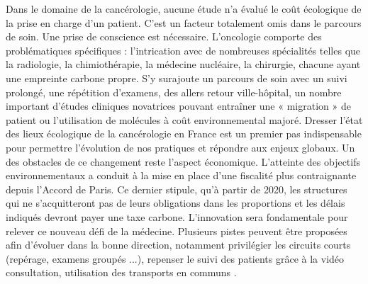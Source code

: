 Dans le domaine de la cancérologie, aucune étude n'a évalué le coût écologique de la prise en charge d'un patient. C'est un facteur totalement omis dans le parcours de soin. Une prise de conscience est nécessaire. L'oncologie comporte des problématiques spécifiques : l'intrication avec de nombreuses spécialités telles que la radiologie, la chimiothérapie, la médecine nucléaire, la chirurgie, chacune ayant une empreinte carbone propre. S'y surajoute un parcours de soin avec un suivi prolongé, une répétition d'examens, des allers retour ville-hôpital, un nombre important d'études cliniques novatrices pouvant entraîner une « migration » de patient ou l'utilisation de molécules à coût environnemental majoré. Dresser l'état des lieux écologique de la cancérologie en France est un premier pas indispensable pour permettre l'évolution de nos pratiques et répondre aux enjeux globaux. Un des obstacles de ce changement reste l'aspect économique. L'atteinte des objectifs environnementaux a conduit à la mise en place d'une fiscalité plus contraignante depuis l'Accord de Paris. Ce dernier stipule, qu'à partir de 2020, les structures qui ne s'acquitteront pas de leurs obligations dans les proportions et les délais indiqués devront payer une taxe carbone. L'innovation sera fondamentale pour relever ce nouveau défi de la médecine. Plusieurs pistes peuvent être proposées afin d'évoluer dans la bonne direction, notamment privilégier les circuits courts (repérage, examens groupés ...), repenser le suivi des patients grâce à la vidéo consultation, utilisation des transports en communs \cite{guillon_empreinte_2020}.

